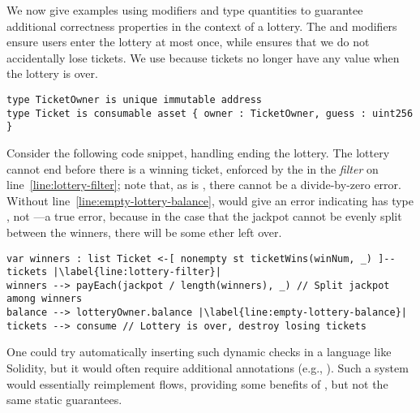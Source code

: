 \documentclass[dvipsnames,runningheads]{llncs}
\begin{document}
We now give examples using modifiers and type quantities to guarantee additional correctness properties in the context of a lottery.
The  and  modifiers ensure users enter the lottery at most once, while  ensures that we do not accidentally lose tickets.
We use  because tickets no longer have any value when the lottery is over.
\begin{lstlisting}[language=flow]
type TicketOwner is unique immutable address
type Ticket is consumable asset { owner : TicketOwner, guess : uint256 }
\end{lstlisting}
Consider the following code snippet, handling ending the lottery.
The lottery cannot end before there is a winning ticket, enforced by the  in the \emph{filter} on line~\ref{line:lottery-filter}; note that, as  is , there cannot be a divide-by-zero error.
Without line~\ref{line:empty-lottery-balance}, \langName would give an error indicating  has type , not ---a true error, because in the case that the jackpot cannot be evenly split between the winners, there will be some ether left over.
\begin{lstlisting}[language=flow]
var winners : list Ticket <-[ nonempty st ticketWins(winNum, _) ]-- tickets |\label{line:lottery-filter}|
winners --> payEach(jackpot / length(winners), _) // Split jackpot among winners
balance --> lotteryOwner.balance |\label{line:empty-lottery-balance}|
tickets --> consume // Lottery is over, destroy losing tickets
\end{lstlisting}

One could try automatically inserting such dynamic checks in a language like Solidity, but it would often require additional annotations (e.g., ).
Such a system would essentially reimplement flows, providing some benefits of \langName, but not the same static guarantees.
\end{document}
